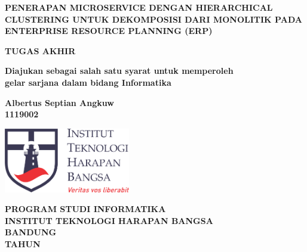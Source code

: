 \begin{titlepage}
	\begin{center}
		\vspace*{0cm}
		
		{\large \bfseries PENERAPAN MICROSERVICE DENGAN HIERARCHICAL CLUSTERING UNTUK DEKOMPOSISI DARI MONOLITIK PADA ENTERPRISE RESOURCE PLANNING (ERP) }
			
		\vspace{3cm}
		
	 	{\large \bfseries TUGAS AKHIR}
	 	
	 	\vspace{1cm}
	 	{ \bfseries Diajukan sebagai salah satu syarat untuk memperoleh \\
	 				gelar sarjana dalam bidang Informatika }
 		

		\vspace{1cm}
		
		{ \bfseries Albertus Septian Angkuw \\ 1119002 }
		
	
		\vspace*{\fill} 
		
		\includegraphics[width=5.5cm]{img/ithb.png}
	
		\vspace{2.5cm}

		{\large \bfseries PROGRAM STUDI INFORMATIKA \\
		INSTITUT TEKNOLOGI HARAPAN BANGSA \\
		BANDUNG\\
		TAHUN}
		
		\vspace{1cm}
	\end{center}
\end{titlepage}